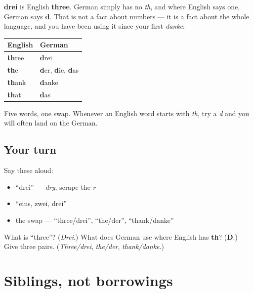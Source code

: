 \begin{cousinweb}
\textbf{drei} is English \textbf{three}. German simply has no \emph{th}, and where English says one, German says \textbf{d}. That is not a fact about numbers — it is a fact about the whole language, and you have been using it since your first \emph{danke}:

\noindent
\begin{tabularx}{\linewidth}{@{}>{\raggedright\arraybackslash}X>{\raggedright\arraybackslash}X@{}}
\toprule
\textbf{English} & \textbf{German} \\
\midrule
\textbf{th}ree & \textbf{d}rei \\
\textbf{th}e & \textbf{d}er, \textbf{d}ie, \textbf{d}as \\
\textbf{th}ank & \textbf{d}anke \\
\textbf{th}at & \textbf{d}as \\
\bottomrule
\end{tabularx}

Five words, one swap. Whenever an English word starts with \emph{th}, try a \emph{d} and you will often land on the German.
\end{cousinweb}

\subsection*{Your turn}
Say these aloud:

\begin{itemize}
\raggedright
  \item \textquotedblleft{}drei\textquotedblright{} — \emph{dry}, scrape the \emph{r}
  \item \textquotedblleft{}eins, zwei, drei\textquotedblright{}
  \item the swap — \textquotedblleft{}three/drei\textquotedblright{}, \textquotedblleft{}the/der\textquotedblright{}, \textquotedblleft{}thank/danke\textquotedblright{}
\end{itemize}

\begin{tcolorbox}[breakable,colback=teal!4,colframe=teal!35!black,title={Before you move on}]
What is \textquotedblleft{}three\textquotedblright{}? (\emph{Drei}.) What does German use where English has \textbf{th}? (\textbf{D}.) Give three pairs. (\emph{Three/drei}, \emph{the/der}, \emph{thank/danke}.)
\end{tcolorbox}
\section[(siblings, not borrowings)]{Siblings, not borrowings}

